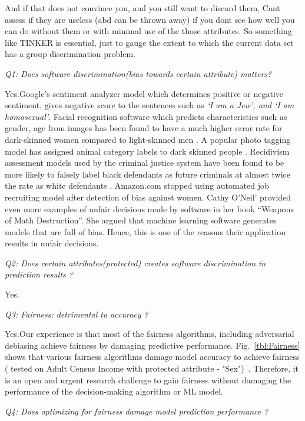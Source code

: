 And if that does not convince you, and you still want to discard them, Cant assess if they are useless (abd can be thrown away) if you dont see how well you can do without them or with minimal use of the those attributes. So something like TINKER is essential, just to gauge the extent to which the current data set has a group discrimination problem.

{\em Q1: Does software discrimination(bias towards certain attribute) matters?}

Yes.Google's sentiment analyzer model which determines positive or negative sentiment, gives negative score to the sentences such as \textit{`I am a Jew', and `I am homosexual'}\cite{Google_Sentiment}. Facial recognition software which predicts characteristics such as gender, age from images has been found to have a much higher error rate for dark-skinned women compared to light-skinned men \cite{Gender_Bias}. A popular photo tagging model has assigned animal category labels to dark skinned people \cite{Google_Photo}. Recidivism assessment models used by the criminal justice system have been found to be more likely to falsely label black defendants as future criminals at almost twice the rate as white defendants \cite{Machine_Bias}. Amazon.com stopped using automated job recruiting model after detection of bias against women\cite{Amazon_Bias}. Cathy O'Neil’ provided even more examples of unfair decisions made by software in her book ``Weapons of Math Destruction''\cite{O'Neil:2016:WMD:3002861}. She argued that machine learning software generates models that are full of bias. Hence, this is one of the reasons their application results in unfair decisions.

{\em Q2: Does certain attributes(protected) creates software  discrimination in prediction results ?}

Yes.

{\em Q3: Fairness: detrimental to accuracy ?}

Yes.Our experience is that most of the fairness algorithms, including
adversarial debiasing   achieve fairness by damaging
predictive performance.  Fig.~\ref{tbl:Fairness} shows that various fairness algorithms damage model accuracy to achieve fairness ( tested on  Adult Census Income with protected attribute - "Sex")~\cite{IBM}.
Therefore, it is an open and urgent research challenge to gain fairness without damaging the performance of the decision-making algorithm or ML model.  



{\em Q4: Does optimizing for fairness damage model prediction performance ?}



